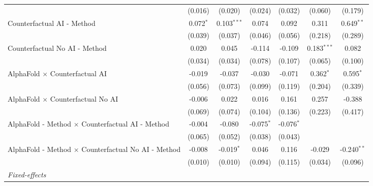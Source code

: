 \begin{tabular}{lcccccc}
                                                              & (0.016)     & (0.020)       & (0.024)      & (0.032)      & (0.060)        & (0.179)\\   
   Counterfactual AI - Method                                 & 0.072$^{*}$ & 0.103$^{***}$ & 0.074        & 0.092        & 0.311          & 0.649$^{**}$\\   
                                                              & (0.039)     & (0.037)       & (0.046)      & (0.056)      & (0.218)        & (0.289)\\   
   Counterfactual No AI - Method                              & 0.020       & 0.045         & -0.114       & -0.109       & 0.183$^{***}$  & 0.082\\   
                                                              & (0.034)     & (0.034)       & (0.078)      & (0.107)      & (0.065)        & (0.100)\\   
   AlphaFold $\times$ Counterfactual AI                       & -0.019      & -0.037        & -0.030       & -0.071       & 0.362$^{*}$    & 0.595$^{*}$\\   
                                                              & (0.056)     & (0.073)       & (0.099)      & (0.119)      & (0.204)        & (0.339)\\   
   AlphaFold $\times$ Counterfactual No AI                    & -0.006      & 0.022         & 0.016        & 0.161        & 0.257          & -0.388\\   
                                                              & (0.069)     & (0.074)       & (0.104)      & (0.136)      & (0.223)        & (0.417)\\   
   AlphaFold - Method $\times$ Counterfactual AI - Method     & -0.004      & -0.080        & -0.075$^{*}$ & -0.076$^{*}$ &                &   \\   
                                                              & (0.065)     & (0.052)       & (0.038)      & (0.043)      &                &   \\   
   AlphaFold - Method $\times$ Counterfactual No AI - Method  & -0.008      & -0.019$^{*}$  & 0.046        & 0.116        & -0.029         & -0.240$^{**}$\\   
                                                              & (0.010)     & (0.010)       & (0.094)      & (0.115)      & (0.034)        & (0.096)\\   
   \midrule
   \emph{Fixed-effects}\\

\end{tabular}
